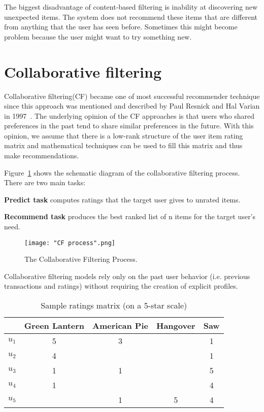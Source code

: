 \documentclass[oneside,13pt]{extreport}
\begin{document}
The biggest disadvantage of content-based filtering is inability at discovering new unexpected items. The system does not recommend these items that are different from anything that the user has seen before. Sometimes this might become problem
because the user might want to try something new.


\section{Collaborative filtering}
Collaborative filtering(CF) became one of most successful recommender technique since this approach was mentioned and described by Paul Resnick and Hal Varian in 1997~\cite{resnick1997recommender}. The underlying opinion of the CF approaches is that users who shared preferences in the past tend to share similar preferences in the future. With this opinion,
we assume that there is a low-rank structure of the user item rating
matrix and mathematical techniques can be used to fill this matrix
and thus make recommendations.
 
Figure~\ref{fig:CF process} shows the schematic diagram of the collaborative filtering process. There are two main tasks:
\begin{description}
    \item{\textbf{Predict task}} computes ratings that the target user gives to unrated items. 
    \item{\textbf{Recommend task}} produces the best ranked list of n items for the target user’s need.
\end{description}
\begin{figure}[h!]
    \centering
    \texttt{[image: "CF process".png]} 
    \caption{The Collaborative Filtering Process.}
    \label{fig:CF process}
\end{figure}
\clearpage    
Collaborative filtering models rely only on the past user behavior (i.e. previous transactions and ratings) without requiring the creation of explicit profiles. 

\begin{table}[h!]
    \small\centering
    \begin{tabular}{|c|c|c|c|c|}
        \hline
         & Green Lantern & American Pie & Hangover & Saw   \\
        \hline \hline
        $u_1$ & 5 & 3 &  & 1 \\
        \hline
        $u_2$ & 4 &  &  & 1 \\
        \hline
        $u_3$ & 1 & 1 &  & 5 \\
        \hline
        $u_4$ & 1 &  &  & 4 \\
        \hline
        $u_5$ &  & 1 & 5 & 4 \\
        \hline
    \end{tabular}
    \caption{Sample ratings matrix (on a 5-star scale)}
    \label{tab:rating_matrix-1}
\end{table}
\end{document}
